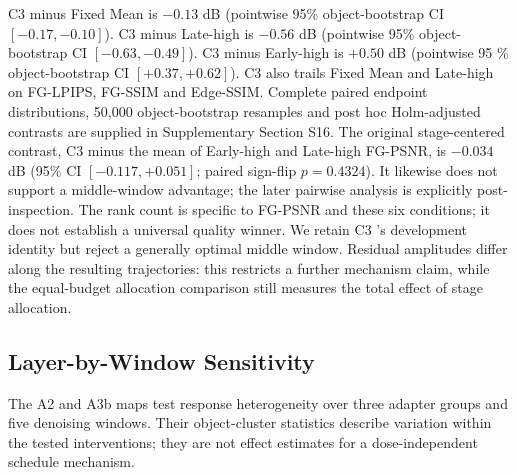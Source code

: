 \documentclass[times,twocolumn,final]{elsarticle}
\providecommand{\DIFadd}[1]{{\protect\color{blue} \sf #1}} %
\providecommand{\DIFaddbegin}{} %
\providecommand{\DIFaddend}{} %
\begin{document}
  C3  
 \DIFaddbegin \DIFadd{minus Fixed Mean is $-0.13$ dB (pointwise 95\% object-bootstrap CI $[-0.17,-0.10]$). }\DIFaddend C3   \DIFaddbegin \DIFadd{minus Late-high is $-0.56$ dB (pointwise 95\% object-bootstrap CI $[-0.63,-0.49]$). C3 minus Early-high is $+0.50$ dB (pointwise }\DIFaddend 95  \DIFaddbegin \DIFadd{\% object-bootstrap CI $[+0.37,+0.62]$). }\DIFaddend C3   \DIFaddbegin \DIFadd{also trails Fixed Mean and Late-high on FG-LPIPS, FG-SSIM and Edge-SSIM. Complete paired endpoint distributions, 50,000 object-bootstrap resamples and post hoc Holm-adjusted contrasts are supplied in Supplementary Section S16. The original stage-centered contrast, C3 minus the mean of Early-high and Late-high FG-PSNR, is $-0.034$ dB (95\% CI $[-0.117,+0.051]$; paired sign-flip $p=0.4324$). It likewise does not support a middle-window advantage; the later pairwise analysis is explicitly post-inspection. The rank count is specific to FG-PSNR and these six conditions; it does }\DIFaddend not establish a   \DIFaddbegin \DIFadd{universal quality winner. We retain }\DIFaddend C3  \DIFaddbegin \DIFadd{'s development identity but reject a generally optimal middle window. Residual amplitudes differ along the resulting trajectories: this restricts a further mechanism claim, while the equal-budget allocation comparison still measures the total effect of stage allocation}\DIFaddend .

  \DIFaddbegin \subsection{Layer-by-Window Sensitivity}
\label{subsec:layerwindow}
\DIFaddend 

  \DIFaddbegin \DIFadd{The A2 and A3b maps test response heterogeneity over three adapter groups and five denoising windows. Their object-cluster statistics describe variation within the tested interventions; they are not effect estimates for a dose-independent schedule mechanism}\DIFaddend .
\end{document}
